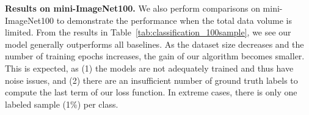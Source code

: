 \textbf{Results on mini-ImageNet100.} We also perform comparisons on mini-ImageNet100 to demonstrate the performance when the total data volume is limited.
%
From the results in Table~\ref{tab:classification_100sample}, we see our model generally outperforms all baselines. 
%
As the dataset size decreases and the number of training epochs increases, the gain of our algorithm becomes smaller. This is expected, as (1) the models are not adequately trained and thus have noise issues, and (2) there are an insufficient number of ground truth labels to compute the last term of our loss function. In extreme cases, there is only one labeled sample (1\%) per class.






